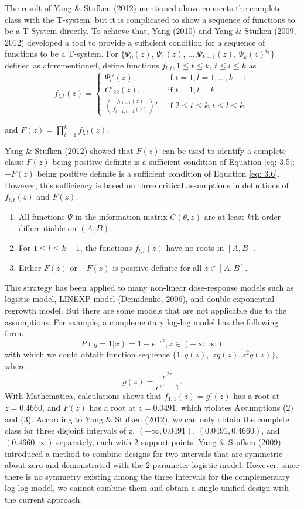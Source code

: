 \documentclass[12pt]{TD-CJS}
\begin{document}
The result of Yang \& Stufken (2012) mentioned above connects the complete class with the T-system, but it is complicated to show a sequence of functions to be a T-System directly. To achieve that, Yang (2010) and Yang \& Stufken (2009, 2012) developed a tool to provide a sufficient condition for a sequence of functions to be a T-system. For $\{\Psi_0(z)$, $\Psi_1(z)$, $\ldots$,$\Psi_{k-1}(z)$, $\Psi_k(z)^Q\}$ defined as aforementioned, define functions $f_{l,t}, 1\le t \le k$, $t\le l \le k$ as
\begin{equation}
    \label{eq: ff}
f_{l,t}(z) = \left \{ \begin{array}{ll}
\Psi_l'(z), & \text{if } t=1,l=1,...,k-1\\
C'_{22}(z), & \text{if } t=1,l=k\\
(\frac{f_{l,t-1}(z)}{f_{t-1,t-1}(z)})', & \text{if } 2\le t\le k, t\le l \le k.
\end{array}\right.
\end{equation}

and   $F(z) = \prod_{l=1}^k f_{l,l}(z)$. 

Yang \& Stufken (2012) showed that $F(z)$ can be used to identify a complete class: $F(z)$ being positive definite is a sufficient condition of Equation \eqref{eq: 3.5}; $-F(z)$ being positive definite is a sufficient condition of Equation \eqref{eq: 3.6}. However, this sufficiency is based on three critical assumptions in definitions of $f_{l,t}(z)$ and $F(z)$.
\begin{enumerate}[(1)]
\item All functions $\Psi$ in the information matrix $C(\theta,z)$ are at least $k$th order differentiable on $(A,B)$.
\item For $1\le l\le k-1$, the functions $f_{l,l}(z)$ have no roots in $[A,B]$.
\item Either $F(z)$ or $-F(z)$ is positive definite for all $z\in [A,B]$.
\end{enumerate} 


 This strategy has been applied to many non-linear dose-response models such as logistic model, LINEXP model (Demidenko, 2006), and double-exponential regrowth model. But there are some models that are not applicable due to the assumptions. For example, a complementary log-log model has the following form. \[P(y=1|x) = 1-e^{-e^{z}}, z\in(-\infty,\infty)\] with which we could obtaib function sequence $\{1,g(z),$ $zg(z),z^2g(z)\}$, where \[g(z)=\frac{e^{2z}}{e^{e^z}-1}.\] 
 With Mathematica, calculations shows that $f_{1,1}(z) = g'(z)$ has a root at $z=0.4660$, and $F(z)$ has a root at $z=0.0491$, which violates Assumptions (2) and (3). According to Yang \& Stufken (2012), we can only obtain the complete class for three disjoint intervals of z, $(-\infty, 0.0491)$, $(0.0491, 0.4660)$, and $(0.4660,\infty)$ separately, each with 2 support points. Yang \& Stufken (2009) introduced a method to combine designs for two intervals that are symmetric about zero and demonstrated with the 2-parameter logistic model. However, since there is no symmetry existing among the three intervals for the complementary log-log model, we cannot combine them and obtain a single unified design with the current approach.
\end{document}
